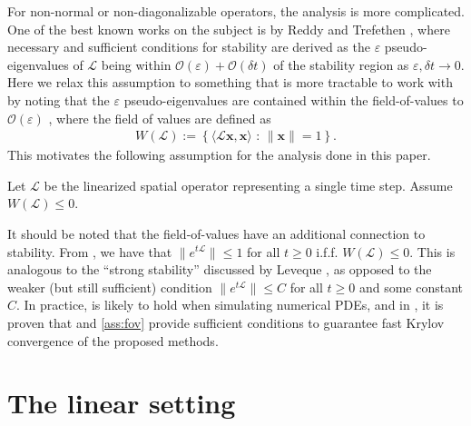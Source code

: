 \documentclass[review]{siamart}
\begin{document}
For non-normal or non-diagonalizable operators, the analysis is more complicated.
One of the best known works on the subject is by Reddy and Trefethen \cite{reddy92},
where necessary and sufficient conditions for stability are derived as the
$\varepsilon$ pseudo-eigenvalues of $\mathcal{L}$ being within 
$\mathcal{O}(\varepsilon) + \mathcal{O}(\delta t)$ of the stability region
as $\varepsilon,\delta t\to 0$. Here we relax this assumption to something
that is more tractable to work with by noting that the $\varepsilon$
pseudo-eigenvalues are contained within the field-of-values to
$\mathcal{O}(\varepsilon)$ \cite[Eq. (17.9)]{trefethen2005spectra},
where the field of values are defined as
%
\begin{align}\label{eq:fov}
W(\mathcal{L}) := \left\{ \langle \mathcal{L}\mathbf{x},\mathbf{x}\rangle \text{ : }
	\|\mathbf{x}\| = 1 \right\}.
\end{align}
%
This motivates the following assumption for the analysis done in this paper.
%
\begin{assumption}\label{ass:fov}
Let $\mathcal{L}$ be the linearized spatial operator representing a single
time step. Assume $W(\mathcal{L}) \leq 0$.
\end{assumption}
%
It should be noted that the field-of-values have an additional connection
to stability. From \cite[Theorem 17.1]{trefethen2005spectra}, we have that
$\|e^{t\mathcal{L}}\|\leq 1$ for all $t\geq 0$ i.f.f. $W(\mathcal{L}) \leq 0$.
This is analogous to the ``strong stability'' discussed by Leveque 
\cite[Chapter 9.5]{leveque2007finite}, as opposed to the weaker (but still
sufficient) condition $\|e^{t\mathcal{L}}\|\leq C$ for all $t\geq 0$ and
some constant $C$. In practice,  is likely to hold when
simulating numerical PDEs, and in ,
it is proven that  and \ref{ass:fov} provide sufficient conditions
to guarantee fast Krylov convergence of the proposed methods.

\section{The linear setting}\label{sec:solve}
\end{document}
